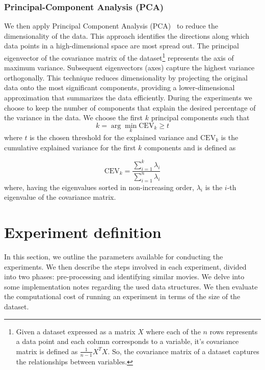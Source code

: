 \subsubsection{Principal-Component Analysis (PCA)}
We then apply Principal Component Analysis (PCA)~\cite{Pearson1901lines} to reduce the dimensionality of the data. This approach identifies the directions along which data points in a high-dimensional space are most spread out. The principal eigenvector of the covariance matrix of the dataset\footnote{Given a dataset expressed as a matrix $X$ where each of the $n$ rows represents a data point and each column corresponds to a variable, it's covariance matrix is defined as $\frac{1}{n-1}X^{T}X$. So, the covariance matrix of a dataset captures the relationships between variables.} represents the axis of maximum variance. Subsequent eigenvectors (axes) capture the highest variance orthogonally. This technique reduces dimensionality by projecting the original data onto the most significant components, providing a lower-dimensional approximation that summarizes the data efficiently.
During the experiments we choose to keep the number of components that explain the desired percentage of the variance in the data. We choose the first $k$ principal components such that
\begin{equation*}
    k = \arg\min_{k}{\text{CEV}_k \geq t}
\end{equation*}
where $t$ is the chosen threshold for the explained variance and $\text{CEV}_k$ is the cumulative explained variance for the first $k$ components and is defined as

\begin{equation*}
    \text{CEV}_k = \frac{\sum_{i=1}^{k} \lambda_i}{\sum_{i=1}^{n} \lambda_i}
\end{equation*}
where, having the eigenvalues sorted in non-increasing order, $\lambda_i$ is the $i$-th eigenvalue of the covariance matrix.

\section{Experiment definition}\label{experiments_definition}
In this section, we outline the parameters available for conducting the experiments. We then describe the steps involved in each experiment, divided into two phases: pre-processing and identifying similar movies. We delve into some implementation notes regarding the used data structures. We then evaluate the computational cost of running an experiment in terms of the size of the dataset.

